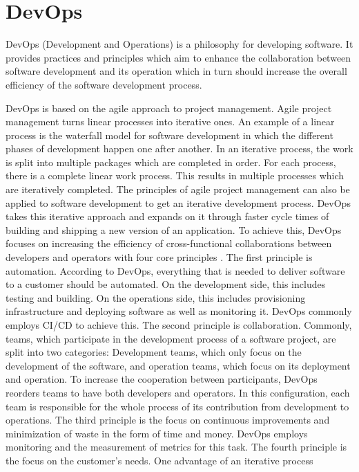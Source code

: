 \section{DevOps}
\label{sec:foundation_devops}

DevOps (Development and Operations) is a philosophy for developing software.
It provides practices and principles which aim to enhance the collaboration
between software development and its operation which in turn should increase
the overall efficiency of the software development process.

DevOps is based on the agile approach to project management.
Agile project management turns linear processes into iterative ones.
An example of a linear process is the waterfall model for software development in which
the different phases of development happen one after another.
In an iterative process, the work is split into multiple packages
which are completed in order. For each process, there is a complete linear work process.
This results in multiple processes which are iteratively completed.
The principles of agile project management can also be applied to software development
to get an iterative development process.
DevOps takes this iterative approach and expands on it through faster cycle times of
building and shipping a new version of an application.
To achieve this, DevOps focuses on increasing the efficiency of cross-functional
collaborations between developers and operators with four core principles \cite{GIT-DEV}.
The first principle is automation. According to DevOps, everything that is needed
to deliver software to a customer should be automated. On the development side, this includes
testing and building. On the operations side, this includes provisioning infrastructure
and deploying software as well as monitoring it. DevOps commonly employs CI/CD to achieve this.
The second principle is collaboration. Commonly, teams, which participate in the
development process of a software project, are split into two categories:
Development teams, which only focus on the development of the software,
and operation teams, which focus on its deployment and operation.
To increase the cooperation between participants, DevOps reorders teams to have both
developers and operators. In this configuration, each team is responsible for the whole process
of its contribution from development to operations.
The third principle is the focus on continuous improvements and minimization of waste
in the form of time and money. DevOps employs monitoring and the measurement of metrics
for this task.
The fourth principle is the focus on the customer's needs. One advantage of an iterative process
